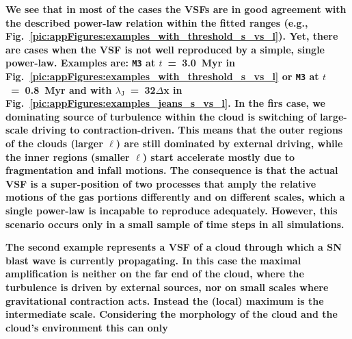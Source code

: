 \textbf{
    We see that in most of the cases the VSFs are in good agreement with the described power-law relation within the fitted ranges (e.g., Fig.~\ref{pic:appFigures:examples_with_threshold_s_vs_l}). 
    Yet, there are cases when the VSF is not well reproduced by a simple, single power-law.
    Examples are: \texttt{M3} at $t$~=~3.0~Myr in Fig.~\ref{pic:appFigures:examples_with_threshold_s_vs_l} or \texttt{M3} at $t$~=~0.8~Myr and with $\lambda_\mathrm{J}$~=~32$\Delta$x in Fig.~\ref{pic:appFigures:examples_jeans_s_vs_l}.
    In the firs case, we dominating source of turbulence within the cloud is switching of large-scale driving to contraction-driven. 
    This means that the outer regions of the clouds (larger $\ell$) are still dominated by external driving, while the inner regions (smaller $\ell$) start accelerate mostly due to fragmentation and infall motions.
    The consequence is that the actual VSF is a super-position of two processes that amply the relative motions of the gas portions differently and on different scales, which a single power-law is incapable to reproduce adequately. 
    However, this scenario occurs only in a small sample of time steps in all simulations. 
}

\textbf{
    The second example represents a VSF of a cloud through which a SN blast wave is currently propagating.
    In this case the maximal amplification is neither on the far end of the cloud, where the turbulence is driven by external sources, nor on small scales where gravitational contraction acts.
    Instead the (local) maximum is the intermediate scale. 
    Considering the morphology of the cloud and the cloud's environment this can only
}

